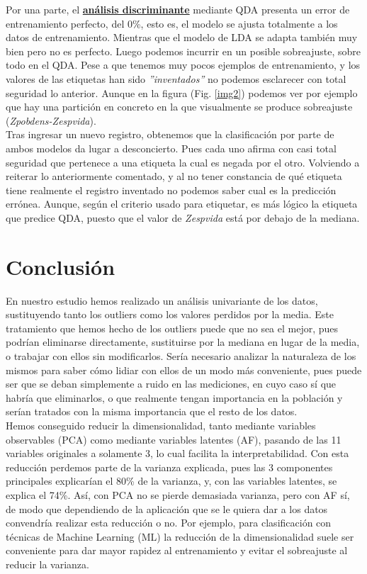 \documentclass[11pt,a4paper]{article}
\begin{document}
	Por una parte, el \textbf{\underline{análisis discriminante}} mediante QDA presenta un error de entrenamiento perfecto, del 0\%, esto es, el modelo se ajusta totalmente a los datos de entrenamiento. Mientras que el modelo de LDA se adapta también muy bien pero no es perfecto. Luego podemos incurrir en un posible sobreajuste, sobre todo en el QDA. Pese a que tenemos muy pocos ejemplos de entrenamiento, y los valores de las etiquetas han sido \textit{''inventados''} no podemos esclarecer con total seguridad lo anterior. Aunque en la figura (Fig. \ref{img2}) podemos ver por ejemplo que hay una partición en concreto en la que visualmente se produce sobreajuste (\textit{Zpobdens-Zespvida}). \\  
	
	Tras ingresar un nuevo registro, obtenemos que la clasificación por parte de ambos modelos da lugar a desconcierto. Pues cada uno afirma con casi total seguridad que pertenece a una etiqueta la cual es negada por el otro. Volviendo a reiterar lo anteriormente comentado, y al no tener constancia de qué etiqueta tiene realmente el registro inventado no podemos saber cual es la predicción errónea. Aunque, según el criterio usado para etiquetar, es más lógico la etiqueta que predice QDA, puesto que el valor de \textit{Zespvida} está por debajo de la mediana. \\
	
	
	\section{Conclusión}  
	
	En nuestro estudio hemos realizado un análisis univariante de los datos, sustituyendo tanto los outliers como los valores perdidos por la media. Este tratamiento que hemos hecho de los outliers puede que no sea el mejor, pues podrían eliminarse directamente, sustituirse por la mediana en lugar de la media, o trabajar con ellos sin modificarlos. Sería necesario analizar la naturaleza de los mismos para saber cómo lidiar con ellos de un modo más conveniente, pues puede ser que se deban simplemente a ruido en las mediciones, en cuyo caso sí que habría que eliminarlos,  o que realmente tengan importancia en la población y serían tratados con la misma importancia que el resto de los datos. \\
	
	Hemos conseguido reducir la dimensionalidad, tanto mediante variables observables (PCA) como mediante variables latentes (AF), pasando de las 11 variables originales a solamente 3, lo cual facilita la interpretabilidad. Con esta reducción perdemos parte de la varianza explicada, pues las 3 componentes principales explicarían el 80\% de la varianza, y, con las variables latentes, se explica el 74\%. Así, con PCA no se pierde demasiada varianza, pero con AF sí, de modo que dependiendo de la aplicación que se le quiera dar a los datos convendría realizar esta reducción o no. Por ejemplo, para clasificación con técnicas de Machine Learning (ML) la reducción de la dimensionalidad suele ser conveniente para dar mayor rapidez al entrenamiento y evitar el sobreajuste al reducir la varianza. \\
\end{document}
